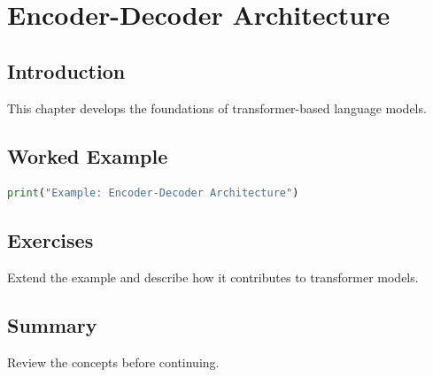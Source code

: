 \chapter{Encoder-Decoder Architecture}
\label{chap:vol8-15}
\section{Introduction}
This chapter develops the foundations of transformer-based language models.

\section{Worked Example}
\begin{lstlisting}[language=Python]
print("Example: Encoder-Decoder Architecture")
\end{lstlisting}

\section{Exercises}
\begin{exercise}
Extend the example and describe how it contributes to transformer models.
\end{exercise}

\section{Summary}
Review the concepts before continuing.
